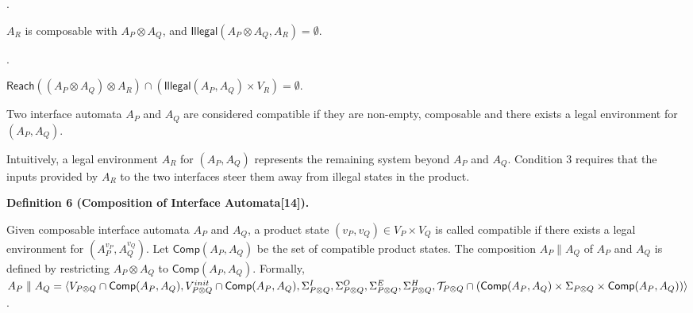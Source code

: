  
 
\par{}. 
 
$A_{R}$ is composable with $A_{P}\otimes A_{Q}$, and $\mathsf{Illegal}(A_{P}\otimes A_{Q},A_{R})=\emptyset$.\par
 
 
 
\par{}. 
 
$\mathsf{Reach}((A_{P}\otimes A_{Q})\otimes A_{R})\cap(\mathsf{Illegal}(A_{P},A_{Q})\times V_{R})=\emptyset$.\par
 
 
  
 
 
Two interface automata $A_{P}$ and $A_{Q}$ are considered compatible if they are non-empty, composable and there exists a legal environment for $(A_{P},A_{Q})$.\par
 
 
 
 
Intuitively, a legal environment $A_{R}$ for $(A_{P},A_{Q})$ represents the remaining system beyond $A_{P}$ and $A_{Q}$. Condition 3 requires that the inputs provided by $A_{R}$ to the two interfaces steer them away from illegal states in the product.\par
 
 
 
\par\medskip\noindent\textbf{Definition 6 (Composition of Interface Automata[14]).}\par
 
 
Given composable interface automata $A_{P}$ and $A_{Q}$, a product state $(v_{P},v_{Q})\in V_{P}\times V_{Q}$ is called compatible if there exists a legal environment for $(A_{P}^{v_{P}},A_{Q}^{v_{Q}})$. Let $\mathsf{Comp}(A_{P},A_{Q})$ be the set of compatible product states. The composition $A_{P}\parallel A_{Q}$ of $A_{P}$ and $A_{Q}$ is defined by restricting $A_{P}\otimes A_{Q}$ to $\mathsf{Comp}(A_{P},A_{Q})$. Formally, $A_{P}\parallel A_{Q}=\langle V_{P\otimes Q}\cap\mathsf{Comp}(A_{P},A_{Q}),V_{P\otimes Q}^{init}\cap\mathsf{Comp}(A_{P},A_{Q}),\Sigma_{P\otimes Q}^{I},\Sigma_{P\otimes Q}^{O},\Sigma_{P\otimes Q}^{E},\\
\Sigma_{P\otimes Q}^{H},\mathcal{T}_{P\otimes Q}\cap(\mathsf{Comp}(A_{P},A_{Q})\times\Sigma_{P\otimes Q}\times\mathsf{Comp}(A_{P},A_{Q}))\rangle$.\par
 
